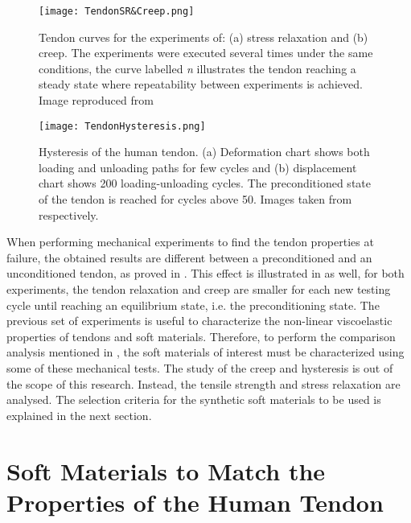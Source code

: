 \begin{figure}[htb!]
	\centering
	\texttt{[image: TendonSR\&Creep.png]}
	\caption{Tendon curves for the experiments of: (a) stress relaxation and (b) creep. The experiments were executed several times under the same conditions, the curve labelled \textit{n} illustrates the tendon reaching a steady state where repeatability between experiments is achieved. Image reproduced from \cite{maurel1998biomechanical} }
	\label{fig:tendonSR_Creep}
\end{figure}

\begin{figure}[htb!]
	\centering
	\texttt{[image: TendonHysteresis.png]}
	\caption{Hysteresis of the human tendon. (a) Deformation chart shows both loading and unloading paths for few cycles and (b) displacement chart shows 200 loading-unloading cycles. The preconditioned state of the tendon is reached for cycles above 50. Images taken from \cite{maurel1998biomechanical,schatzmann1998effect} respectively. }
	\label{fig:tendonHysteresis}
\end{figure}

When performing mechanical experiments to find the tendon properties at failure, the obtained results are different between a preconditioned and an unconditioned tendon, as proved in \cite{schatzmann1998effect}. This effect is illustrated in  as well, for both experiments, the tendon relaxation and creep are smaller for each new testing cycle until reaching an equilibrium state, i.e. the preconditioning state. The previous set of experiments is useful to characterize the non-linear viscoelastic properties of tendons and soft materials. Therefore, to perform the comparison analysis mentioned in , the soft materials of interest must be characterized using some of these mechanical tests. The study of the creep and hysteresis is out of the scope of this research. Instead, the tensile strength and stress relaxation are analysed. The selection criteria for the synthetic soft materials to be used is explained in the next section.

\section{Soft Materials to Match the Properties of the Human Tendon} \label{sec:softMaterials}

